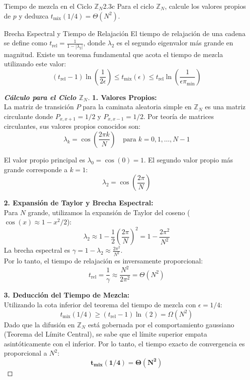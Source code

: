 \documentclass[10pt,a4paper]{article}
\begin{document}
\vspace{5mm}

\begin{ejercicio}{Tiempo de mezcla en el Ciclo $\mathbb{Z}_N$}{2.3c}
    Para el ciclo $\mathbb{Z}_N$, calcule los valores propios de $p$ y deduzca $t_{\text{mix}}(1/4) = \Theta(N^2)$.
\end{ejercicio}

\vspace{2mm}

\begin{nota}{Brecha Espectral y Tiempo de Relajación}
    El tiempo de relajación de una cadena se define como $t_{\text{rel}} = \frac{1}{1 - |\lambda_2|}$, donde $\lambda_2$ es el segundo eigenvalor más grande en magnitud. 
    Existe un teorema fundamental que acota el tiempo de mezcla utilizando este valor:
    \[ (t_{\text{rel}} - 1)\ln\left(\frac{1}{2\epsilon}\right) \le t_{\text{mix}}(\epsilon) \le t_{\text{rel}} \ln\left(\frac{1}{\epsilon \pi_{\min}}\right) \]
\end{nota}

\begin{proof}[\textbf{Cálculo para el Ciclo $\mathbb{Z}_N$}]
    \textbf{1. Valores Propios:} \\
    La matriz de transición $P$ para la caminata aleatoria simple en $\mathbb{Z}_N$ es una matriz circulante donde $P_{x, x+1} = 1/2$ y $P_{x, x-1} = 1/2$. 
    Por teoría de matrices circulantes, sus valores propios conocidos son:
    \[ \lambda_k = \cos\left(\frac{2\pi k}{N}\right) \quad \text{para } k = 0, 1, \dots, N-1 \]
    
    El valor propio principal es $\lambda_0 = \cos(0) = 1$. El segundo valor propio más grande corresponde a $k=1$:
    \[ \lambda_2 = \cos\left(\frac{2\pi}{N}\right) \]
    
    \textbf{2. Expansión de Taylor y Brecha Espectral:} \\
    Para $N$ grande, utilizamos la expansión de Taylor del coseno ($\cos(x) \approx 1 - x^2/2$):
    \[ \lambda_2 \approx 1 - \frac{1}{2}\left(\frac{2\pi}{N}\right)^2 = 1 - \frac{2\pi^2}{N^2} \]
    La brecha espectral es $\gamma = 1 - \lambda_2 \approx \frac{2\pi^2}{N^2}$. \\
    Por lo tanto, el tiempo de relajación es inversamente proporcional:
    \[ t_{\text{rel}} = \frac{1}{\gamma} \approx \frac{N^2}{2\pi^2} = \Theta(N^2) \]
    
    \textbf{3. Deducción del Tiempo de Mezcla:} \\
    Utilizando la cota inferior del teorema del tiempo de mezcla con $\epsilon = 1/4$:
    \[ t_{\text{mix}}(1/4) \ge (t_{\text{rel}} - 1)\ln(2) = \Omega(N^2) \]
    Dado que la difusión en $\mathbb{Z}_N$ está gobernada por el comportamiento gaussiano (Teorema del Límite Central), se sabe que el límite superior empata asintóticamente con el inferior. Por lo tanto, el tiempo exacto de convergencia es proporcional a $N^2$:
    \[ \mathbf{t_{\text{mix}}(1/4) = \Theta(N^2)} \]
\end{proof}
\end{document}
